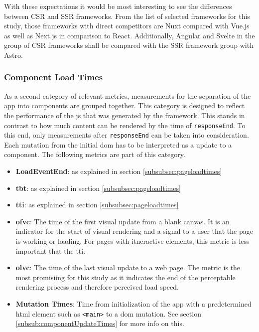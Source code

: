 \documentclass[a4paper, 12pt]{article}
\begin{document}
With these expectations it would be most interesting to see the differences between CSR and SSR frameworks.
From the list of selected frameworks for this study, those frameworks with direct competitors are Nuxt compared with Vue.js as well as Next.js in comparison to React.
Additionally, Angular and Svelte in the group of CSR frameworks shall be compared with the SSR framework group with Astro.

\subsubsection{Component Load Times}\label{subsubsec:componentloadtimes}
% 

As a second category of relevant metrics, measurements for the separation of the app into components are grouped together.
This category is designed to reflect the performance of the \acrlong{js} that was generated by the framework.
This stands in contrast to how much content can be rendered by the time of \verb|responseEnd|.
To this end, only measurements after \verb|responseEnd| can be taken into consideration.
Each mutation from the initial \acrshort{dom} has to be interpreted as a update to a component.
The following metrics are part of this category.

\begin{itemize}
  \item \textbf{LoadEventEnd}: as explained in section \ref{subsubsec:pageloadtimes}
  \item \textbf{\acrfull{tbt}}: as explained in section \ref{subsubsec:pageloadtimes}
  \item \textbf{\acrfull{tti}}: as explained in section \ref{subsubsec:pageloadtimes}
  \item \textbf{\acrfull{ofvc}}: The time of the first visual update from a blank canvas.
  It is an indicator for the start of visual rendering and a signal to a user that the page is working or loading.
  For pages with itneractive elements, this metric is less important that the \acrshort{tti}.
  \item \textbf{\acrfull{olvc}}: The time of the last visual update to a web page.
  The metric is the most promisiing for this study as it indicates the end of the perceptable rendering process and therefore perceived load speed.
  \item \textbf{Mutation Times}: Time from initialization of the app with a predetermined \acrshort{html} element such as \verb|<main>| to a \acrshort{dom} mutation.
  See section \ref{subsub:componentUpdateTimes} for more info on this.
\end{itemize}
\end{document}
